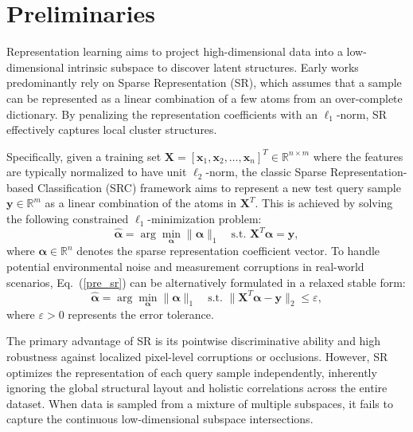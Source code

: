 \documentclass[ASNA,twocolumn]{USG} %
\begin{document}
\section{Preliminaries}\label{Preliminaries}

Representation learning aims to project high-dimensional data into a low-dimensional intrinsic subspace to discover latent structures. Early works predominantly rely on Sparse Representation (SR), which assumes that a sample can be represented as a linear combination of a few atoms from an over-complete dictionary. By penalizing the representation coefficients with an $\ell_1$-norm, SR effectively captures local cluster structures. 

Specifically, given a training set $\boldsymbol{X} = [\boldsymbol{x}_1, \boldsymbol{x}_2, \dots, \boldsymbol{x}_n]^T \in \mathbb{R}^{n \times m}$ where the features are typically normalized to have unit $\ell_2$-norm, the classic Sparse Representation-based Classification (SRC) framework \cite{4483511} aims to represent a new test query sample $\boldsymbol{y} \in \mathbb{R}^m$ as a linear combination of the atoms in $\boldsymbol{X}^T$. This is achieved by solving the following constrained $\ell_1$-minimization problem:
\begin{equation}\label{pre_sr}
\hat{\boldsymbol{\alpha}} = \arg \min_{\boldsymbol{\alpha}} \|\boldsymbol{\alpha}\|_1 \quad \text{s.t. } \boldsymbol{X}^T \boldsymbol{\alpha} = \boldsymbol{y},
\end{equation}
where $\boldsymbol{\alpha} \in \mathbb{R}^n$ denotes the sparse representation coefficient vector. To handle potential environmental noise and measurement corruptions in real-world scenarios, Eq.~(\ref{pre_sr}) can be alternatively formulated in a relaxed stable form:
\begin{equation}\label{pre_sr_stable}
\hat{\boldsymbol{\alpha}} = \arg \min_{\boldsymbol{\alpha}} \|\boldsymbol{\alpha}\|_1 \quad \text{s.t. } \|\boldsymbol{X}^T \boldsymbol{\alpha} - \boldsymbol{y}\|_2 \le \varepsilon,
\end{equation}
where $\varepsilon > 0$ represents the error tolerance. 

The primary advantage of SR is its pointwise discriminative ability and high robustness against localized pixel-level corruptions or occlusions. However, SR optimizes the representation of each query sample independently, inherently ignoring the global structural layout and holistic correlations across the entire dataset. When data is sampled from a mixture of multiple subspaces, it fails to capture the continuous low-dimensional subspace intersections. 
\end{document}
